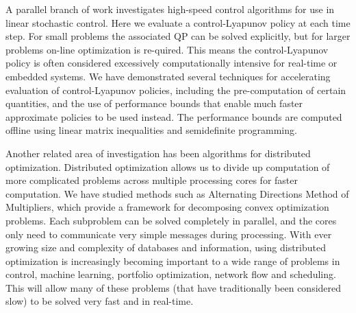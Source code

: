 A parallel branch of work investigates high-speed control algorithms for use in linear stochastic control. Here we evaluate a control-Lyapunov policy at each time step. For small problems the associated QP can be solved explicitly, but for larger problems on-line optimization is re-quired. This means the control-Lyapunov policy is often considered excessively computationally intensive for real-time or embedded systems. We have demonstrated several techniques for accelerating evaluation of control-Lyapunov policies, including the pre-computation of certain quantities, and the use of performance bounds that enable much faster approximate policies to be used instead. The performance bounds are computed offline using linear matrix inequalities and semidefinite programming.

Another related area of investigation has been algorithms for distributed optimization. Distributed optimization allows us to divide up computation of more complicated problems across multiple processing cores for faster computation. We have studied methods such as Alternating Directions Method of Multipliers, which provide a framework for decomposing convex optimization problems. Each subproblem can be solved completely in parallel, and the cores only need to communicate very simple messages during processing. With ever growing size and complexity of databases and information, using distributed optimization is increasingly becoming important to a wide range of problems in control, machine learning, portfolio optimization, network flow and scheduling. This will allow many of these problems (that have traditionally been considered slow) to be solved very fast and in real-time. 


